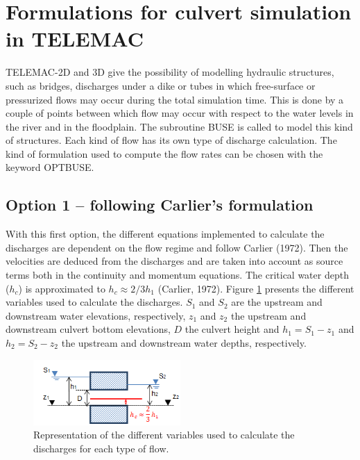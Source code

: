 \section{Formulations for culvert simulation in TELEMAC}

TELEMAC-2D and 3D give the possibility of modelling hydraulic structures, such as bridges,
discharges under a dike or tubes in which free-surface or pressurized flows may
occur during the total simulation time.
This is done by a couple of points between which flow may occur with respect to
the water levels in the river and in the floodplain.
The subroutine BUSE is called to model this kind of structures.
Each kind of flow has its own type of discharge calculation.
The kind of formulation used to compute the flow rates can be chosen with the keyword OPTBUSE.

\subsection{Option 1 -- following Carlier's formulation}

With this first option, the different equations implemented to calculate the
discharges are dependent on the flow regime and follow Carlier (1972).
Then the velocities are deduced from the discharges and are taken into account as source
terms both in the continuity and momentum equations.
The critical water depth ($h_c$) is approximated to $h_c \approx 2/3 h_1$ (Carlier, 1972).
Figure \ref{fig:culvert_fig5} presents the different variables used to calculate the discharges.
$S_1$ and $S_2$ are the upstream and downstream water elevations, respectively, $z_1$ and $z_2$
the upstream and downstream culvert bottom elevations, $D$ the culvert height and $h_1=S_1-z_1$
and $h_2=S_2-z_2$ the upstream and downstream water depths, respectively.

\begin{figure}[H]
\begin{center}
  \includegraphics[width=0.5\textwidth]{culvert_fig5.png}
\end{center}
\caption{Representation of the different variables used to calculate
the discharges for each type of flow.}
\label{fig:culvert_fig5}
\end{figure}

